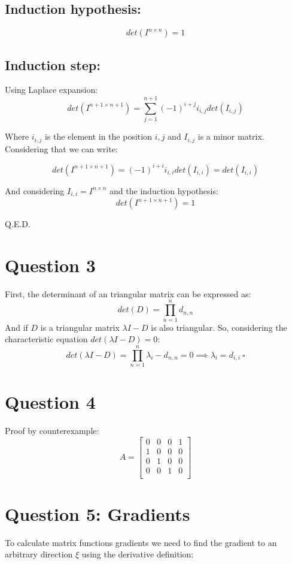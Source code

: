 \documentclass[a4paper]{article}
\begin{document}
\subsection{Induction hypothesis:}
$$
det(I^{n \times n}) = 1
$$

\subsection{Induction step:}
Using Laplace expansion:
$$
det(I^{n+1 \times n+1}) = \sum^{n + 1}_{j = 1} (-1)^{i + j} i_{i,j} det(I_{i,j})
$$

Where $i_{i,j}$ is the element in the position $i,j$ and $I_{i,j}$ is a minor matrix. Considering that we can write:

$$
det(I^{n+1 \times n+1}) = (-1)^{i + i} i_{i,i} det(I_{i,i}) = det(I_{i,i})
$$

And considering $I_{i,i} = I^{n \times n}$ and the induction hypothesis:
$$
det(I^{n+1 \times n+1}) = 1
$$

Q.E.D.

\section{Question 3}
First, the determinant of an triangular matrix can be expressed as:
$$
det(D) = \prod_{n=1}^{n} d_{n,n}
$$
And if $D$ is a triangular matrix $\lambda I - D$ is also triangular. So, considering the characteristic equation $det(\lambda I - D) = 0$:
$$
det(\lambda I - D) = \prod_{n=1}^{n} \lambda_i - d_{n,n} = 0 \implies \lambda_i = d_{i,i} \ \square
$$

\section{Question 4}
Proof by counterexample:
$$
A =
 \begin{bmatrix}
  0 & 0 & 0 & 1 \\
  1 & 0 & 0 & 0 \\
  0 & 1 & 0 & 0 \\
  0 & 0 & 1 & 0 \\
 \end{bmatrix}
$$

\section{Question 5: Gradients}
To calculate matrix functions gradients we need to find the gradient to an arbitrary direction $\xi$ using the derivative definition:
\end{document}
